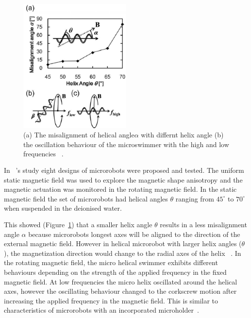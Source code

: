 \documentclass[12pt,a4paper,titlepage]{report}
\begin{document}
\begin{figure}
  \begin{center}
    \includegraphics[width=0.5\textwidth]{7}
  \caption{(a) The misalignment of helical angle$\alpha$ with differnt helix angle (b) the oscillation behaviour
of the microswimmer with the high and low frequencies ~\citep{tottori2012magnetic}.}
  \label{ref7}
\end{center}
\end{figure}


In ~\citeauthor{tottori2012magnetic}\rq{}s study eight designs of microrobots were proposed and tested. 
The uniform static magnetic field was used to explore the magnetic shape anisotropy and the 
magnetic actuation was monitored in the rotating magnetic field. In the static magnetic field the 
set of microrobots had helical angles $\theta$ ranging from ${45^{\circ}}$ to ${70^{\circ}}$ when suspended in the deionised water. 

This showed (Figure~\ref{ref7}) that a smaller helix angle $\theta$ results in a less misalignment 
angle $\alpha$ because microrobots longest axes will be aligned to the direction of the external magnetic field. 
However in helical microrobot with larger helix angles ($\theta$), the magnetization direction would change to 
the radial axes of the helix  ~\citep{tottori2012magnetic}.
In the rotating magnetic field, the micro helical swimmer exhibits different behaviours depending on 
the strength of the applied frequency in the fixed magnetic field. At low frequencies the micro helix oscillated 
around the helical axes, however the oscillating behaviour changed to the 
corkscrew motion after increasing the applied frequency in the magnetic field. This is similar to characteristics of 
microrobots with an incorporated
 microholder~\citep{tottori2012magnetic}.
\end{document}
